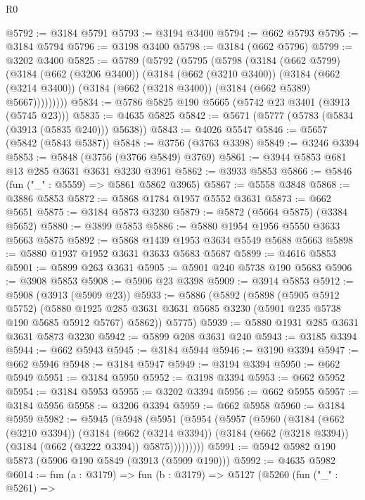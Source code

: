 \begin{lexlean}{R0}
\begin{coremodule}
@5792 := @3184 @5791
@5793 := @3194 @3400
@5794 := @662 @5793
@5795 := @3184 @5794
@5796 := @3198 @3400
@5798 := @3184 (@662 @5796)
@5799 := @3202 @3400
@5825 := @5789
    (@5792
      (@5795
        (@5798
          (@3184
            (@662 @5799)
            (@3184
              (@662 (@3206 @3400))
              (@3184
                (@662 (@3210 @3400))
                (@3184
                  (@662 (@3214 @3400))
                  (@3184 (@662 (@3218 @3400)) (@3184 (@662 @5389) @5667)))))))))
@5834 := @5786 @5825 @190 @5665 (@5742 @23 @3401 (@3913 (@5745 @23)))
@5835 := @4635 @5825
@5842 := @5671 (@5777 (@5783 (@5834 (@3913 (@5835 @240))) @5638))
@5843 := @4026 @5547
@5846 := @5657 (@5842 (@5843 @5387))
@5848 := @3756 (@3763 @3398)
@5849 := @3246 @3394
@5853 := @5848 (@3756 (@3766 @5849) @3769)
@5861 := @3944 @5853 @681 @13 @285 @3631 @3631 @3230 @3961
@5862 := @3933 @5853
@5866 := @5846 (fun ("_" : @5559) => @5861 @5862 @3965)
@5867 := @5558 @3848
@5868 := @3886 @5853
@5872 := @5868 @1784 @1957 @5552 @3631
@5873 := @662 @5651
@5875 := @3184 @5873 @3230
@5879 := @5872 (@5664 @5875) (@3384 @5652)
@5880 := @3899 @5853
@5886 := @5880 @1954 @1956 @5550 @3633 @5663 @5875
@5892 := @5868 @1439 @1953 @3634 @5549 @5688 @5663
@5898 := @5880 @1937 @1952 @3631 @3633 @5683 @5687
@5899 := @4616 @5853
@5901 := @5899 @263 @3631
@5905 := @5901 @240 @5738 @190 @5683
@5906 := @3908 @5853
@5908 := @5906 @23 @3398
@5909 := @3914 @5853
@5912 := @5908 (@3913 (@5909 @23))
@5933 := @5886
    (@5892
      (@5898
        (@5905 @5912 @5752)
        (@5880 @1925 @285 @3631 @3631 @5685 @3230 (@5901 @235 @5738 @190 @5685 @5912 @5767) @5862))
      @5775)
@5939 := @5880 @1931 @285 @3631 @3631 @5873 @3230
@5942 := @5899 @208 @3631 @240
@5943 := @3185 @3394
@5944 := @662 @5943
@5945 := @3184 @5944
@5946 := @3190 @3394
@5947 := @662 @5946
@5948 := @3184 @5947
@5949 := @3194 @3394
@5950 := @662 @5949
@5951 := @3184 @5950
@5952 := @3198 @3394
@5953 := @662 @5952
@5954 := @3184 @5953
@5955 := @3202 @3394
@5956 := @662 @5955
@5957 := @3184 @5956
@5958 := @3206 @3394
@5959 := @662 @5958
@5960 := @3184 @5959
@5982 := @5945
    (@5948
      (@5951
        (@5954
          (@5957
            (@5960
              (@3184
                (@662 (@3210 @3394))
                (@3184
                  (@662 (@3214 @3394))
                  (@3184 (@662 (@3218 @3394)) (@3184 (@662 (@3222 @3394)) @5875)))))))))
@5991 := @5942 @5982 @190 @5873 (@5906 @190 @5849 (@3913 (@5909 @190)))
@5992 := @4635 @5982
@6014 := fun (a : @3179) =>
  fun (b : @3179) =>
  @5127
    (@5260
      (fun ("_" : @5261) =>

\end{coremodule}
\end{lexlean}
